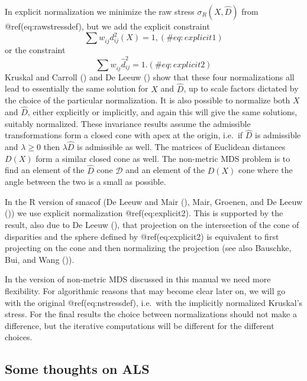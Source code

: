 \documentclass[
  12pt,
  letterpaper,
  DIV=11,
  numbers=noendperiod]{scrartcl}
\begin{document}
In explicit normalization we minimize the raw stress
\(\sigma_R(X,\hat D)\) from @ref(eq:rawstressdef), but we add the
explicit constraint \begin{equation}
\sum   w_{ij}^{\ }d_{ij}^2(X)=1,
(\#eq:explicit1)
\end{equation} or the constraint \begin{equation}
\sum   w_{ij}^{\ }\hat d_{ij}^2=1.
(\#eq:explicit2)
\end{equation} Kruskal and Carroll
() and De Leeuw
() show that these four normalizations
all lead to essentially the same solution for \(X\) and \(\hat D\), up
to scale factors dictated by the choice of the particular normalization.
It is also possible to normalize both \(X\) and \(\hat D\), either
explicitly or implicitly, and again this will give the same solutions,
suitably normalized. These invariance results assume the admissible
transformations form a closed cone with apex at the origin, i.e.~if
\(\hat D\) is admissible and \(\lambda\geq 0\) then \(\lambda\hat D\) is
admissible as well. The matrices of Euclidean distances \(D(X)\) form a
similar closed cone as well. The non-metric MDS problem is to find an
element of the \(\hat D\) cone \(\mathcal{D}\) and an element of the
\(D(X)\) cone where the angle between the two is a small as possible.

In the R version of smacof (De Leeuw and Mair
(), Mair, Groenen, and De Leeuw
()) we use explicit
normalization @ref(eq:explicit2). This is supported by the result, also
due to De Leeuw (), that projection on
the intersection of the cone of disparities and the sphere defined by
@ref(eq:explicit2) is equivalent to first projecting on the cone and
then normalizing the projection (see also Bauschke, Bui, and Wang
()).

In the version of non-metric MDS discussed in this manual we need more
flexibility. For algorithmic reasons that may become clear later on, we
will go with the original @ref(eq:nstressdef), i.e.~with the implicitly
normalized Kruskal's stress. For the final results the choice between
normalizations should not make a difference, but the iterative
computations will be different for the different choices.

\subsection{Some thoughts on ALS}\label{some-thoughts-on-als}
\end{document}
